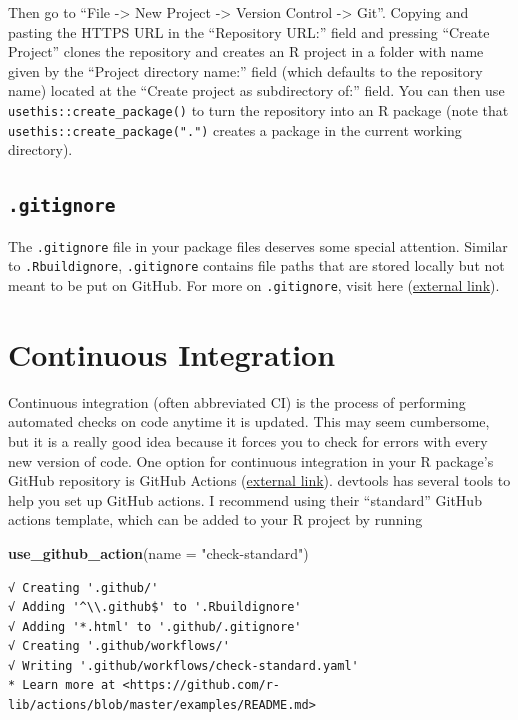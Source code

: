 \documentclass[
]{book}
\newenvironment{Shaded}{\begin{snugshade}}{\end{snugshade}}
\newcommand{\DataTypeTok}[1]{\textcolor[rgb]{0.13,0.29,0.53}{#1}}
\newcommand{\KeywordTok}[1]{\textcolor[rgb]{0.13,0.29,0.53}{\textbf{#1}}}
\newcommand{\NormalTok}[1]{#1}
\newcommand{\StringTok}[1]{\textcolor[rgb]{0.31,0.60,0.02}{#1}}
\begin{document}
Then go to ``File -\textgreater{} New Project -\textgreater{} Version Control -\textgreater{} Git''. Copying and pasting the HTTPS URL in the ``Repository URL:'' field and pressing ``Create Project'' clones the repository and creates an R project in a folder with name given by the ``Project directory name:'' field (which defaults to the repository name) located at the ``Create project as subdirectory of:'' field. You can then use \texttt{usethis::create\_package()} to turn the repository into an R package (note that \texttt{usethis::create\_package(".")} creates a package in the current working directory).

\hypertarget{gitignore}{%
\subsection{\texorpdfstring{\texttt{.gitignore}}{.gitignore}}\label{gitignore}}

The \texttt{.gitignore} file in your package files deserves some special attention. Similar to \texttt{.Rbuildignore}, \texttt{.gitignore} contains file paths that are stored locally but not meant to be put on GitHub. For more on \texttt{.gitignore}, visit here (\href{https://r-pkgs.org/git.html\#git-ignore}{external link}).

\hypertarget{ci}{%
\section{Continuous Integration}\label{ci}}

Continuous integration (often abbreviated CI) is the process of performing automated checks on code anytime it is updated. This may seem cumbersome, but it is a really good idea because it forces you to check for errors with every new version of code. One option for continuous integration in your R package's GitHub repository is GitHub Actions (\href{https://github.com/features/actions}{external link}). devtools has several tools to help you set up GitHub actions. I recommend using their ``standard'' GitHub actions template, which can be added to your R project by running

\begin{Shaded}
\begin{Highlighting}[]
\KeywordTok{use_github_action}\NormalTok{(}\DataTypeTok{name =} \StringTok{"check-standard"}\NormalTok{)}
\end{Highlighting}
\end{Shaded}

\begin{verbatim}
√ Creating '.github/'
√ Adding '^\\.github$' to '.Rbuildignore'
√ Adding '*.html' to '.github/.gitignore'
√ Creating '.github/workflows/'
√ Writing '.github/workflows/check-standard.yaml'
* Learn more at <https://github.com/r-lib/actions/blob/master/examples/README.md>
\end{verbatim}
\end{document}
